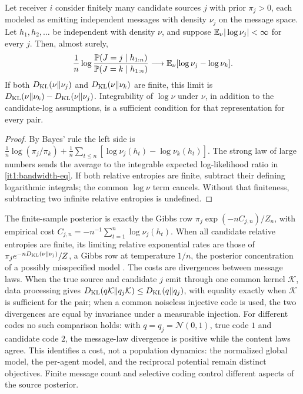 Let receiver $i$ consider finitely many candidate sources $j$ with prior $\pi_j>0$, each modeled as emitting independent messages with density $\nu_j$ on the message space. Let $h_1,h_2,\ldots$ be independent with density $\nu$, and suppose $\mathbb E_\nu|\log\nu_j|<\infty$ for every $j$. Then, almost surely,
\begin{equation}
\frac1n\log\frac{\mathbb P(J=j\mid h_{1:n})}{\mathbb P(J=k\mid h_{1:n})}\longrightarrow\mathbb E_\nu[\log\nu_j-\log\nu_k].
\label{it1:bandwidth-eq}
\end{equation}
If both $D_{\mathrm{KL}}(\nu\Vert\nu_j)$ and $D_{\mathrm{KL}}(\nu\Vert\nu_k)$ are finite, this limit is $D_{\mathrm{KL}}(\nu\Vert\nu_k)-D_{\mathrm{KL}}(\nu\Vert\nu_j)$. Integrability of $\log\nu$ under $\nu$, in addition to the candidate-log assumptions, is a sufficient condition for that representation for every pair.
\begin{proof}
By Bayes' rule the left side is $\frac1n\log(\pi_j/\pi_k)+\frac1n\sum_{t\leq n}[\log\nu_j(h_t)-\log\nu_k(h_t)]$. The strong law of large numbers sends the average to the integrable expected log-likelihood ratio in \cref{it1:bandwidth-eq}. If both relative entropies are finite, subtract their defining logarithmic integrals; the common $\log\nu$ term cancels. Without that finiteness, subtracting two infinite relative entropies is undefined.
\end{proof}

The finite-sample posterior is exactly the Gibbs row $\pi_j\exp(-nC_{j,n})/Z_n$, with empirical cost $C_{j,n}=-n^{-1}\sum_{t=1}^n\log\nu_j(h_t)$. When all candidate relative entropies are finite, its limiting relative exponential rates are those of $\pi_je^{-nD_{\mathrm{KL}}(\nu\Vert\nu_j)}/Z$, a Gibbs row at temperature $1/n$, the posterior concentration of a possibly misspecified model \citep{Berk1966}. The costs are divergences between message laws. When the true source and candidate $j$ emit through one common kernel $\mathcal K$, data processing gives $D_{\mathrm{KL}}(q\mathcal K\Vert q_j\mathcal K)\leq D_{\mathrm{KL}}(q\Vert q_j)$, with equality exactly when $\mathcal K$ is sufficient for the pair; when a common noiseless injective code is used, the two divergences are equal by invariance under a measurable injection. For different codes no such comparison holds: with $q=q_j=\mathcal N(0,1)$, true code $1$ and candidate code $2$, the message-law divergence is positive while the content laws agree. This identifies a cost, not a population dynamics: the normalized global model, the per-agent model, and the reciprocal potential remain distinct objectives. Finite message count and selective coding control different aspects of the source posterior.

